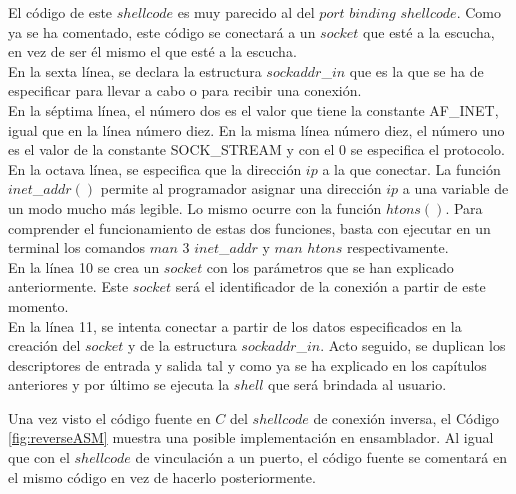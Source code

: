 \documentclass [titlepage, 12pt]{article}
\begin{document}
El c\'odigo de este $shellcode$ es muy parecido al del $port$ $binding$ $shellcode$. Como ya se ha comentado, este c\'odigo se conectar\'a a un $socket$ que est\'e a la escucha, en vez de ser \'el mismo el que est\'e a la escucha.\\
En la sexta l\'inea, se declara la estructura $sockaddr$\_$in$ que es la que se ha de especificar para llevar a cabo o para recibir una conexi\'on.\\
En la s\'eptima l\'inea, el n\'umero dos es el valor que tiene la constante AF\_INET, igual que en la l\'inea n\'umero diez. En la misma l\'inea n\'umero diez, el n\'umero uno es el valor de la constante SOCK\_STREAM y con el 0 se especifica el protocolo.\\
En la octava l\'inea, se especifica que la direcci\'on $ip$ a la que conectar. La funci\'on $inet$\_$addr()$ permite al programador asignar una direcci\'on $ip$ a una variable de un modo mucho m\'as legible. Lo mismo ocurre con la funci\'on $htons()$. Para comprender el funcionamiento de estas dos funciones, basta con ejecutar en un terminal los comandos $man$ $3$ $inet$\_$addr$ y $man$ $htons$ respectivamente.\\
En la l\'inea 10 se crea un $socket$ con los par\'ametros que se han explicado anteriormente. Este $socket$ ser\'a el identificador de la conexi\'on a partir de este momento.\\
En la l\'inea 11, se intenta conectar a partir de los datos especificados en la creaci\'on del $socket$ y de la estructura $sockaddr$\_$in$.
Acto seguido, se duplican los descriptores de entrada y salida tal y como ya se ha explicado en los cap\'itulos anteriores y por \'ultimo se ejecuta la $shell$ que ser\'a brindada al usuario.\bigskip

Una vez visto el c\'odigo fuente en $C$ del $shellcode$ de conexi\'on inversa, el C\'odigo \ref{fig:reverseASM} muestra una posible implementaci\'on en ensamblador. Al igual que con el $shellcode$ de vinculaci\'on a un puerto, el c\'odigo fuente se comentar\'a en el mismo c\'odigo en vez de hacerlo posteriormente. \\
\end{document}
